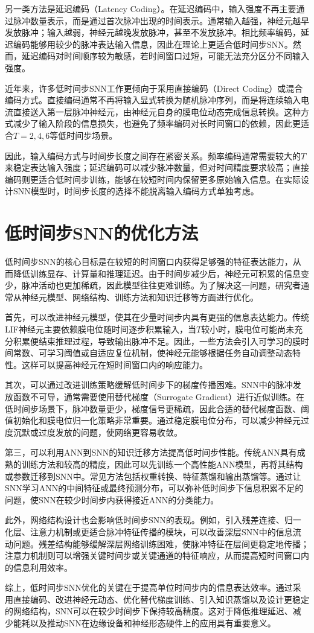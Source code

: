 \documentclass[journal,12pt,onecolumn]{IEEEtran}
\begin{document}
另一类方法是延迟编码（Latency Coding）。在延迟编码中，输入强度不再主要通过脉冲数量表示，而是通过首次脉冲出现的时间表示。通常输入越强，神经元越早发放脉冲；输入越弱，神经元越晚发放脉冲，甚至不发放脉冲。相比频率编码，延迟编码能够用较少的脉冲表达输入信息，因此在理论上更适合低时间步SNN。然而，延迟编码对时间顺序较为敏感，若时间窗口过短，可能无法充分区分不同输入强度。

近年来，许多低时间步SNN工作更倾向于采用直接编码（Direct Coding）或混合编码方式。直接编码通常不再将输入显式转换为随机脉冲序列，而是将连续输入电流直接送入第一层脉冲神经元，由神经元自身的膜电位动态完成信息转换。这种方式减少了输入阶段的信息损失，也避免了频率编码对长时间窗口的依赖，因此更适合$T=2,4,6$等低时间步场景。

因此，输入编码方式与时间步长度之间存在紧密关系。频率编码通常需要较大的$T$来稳定表达输入强度；延迟编码可以减少脉冲数量，但对时间精度要求较高；直接编码则更适合低时间步训练，能够在较短时间内保留更多原始输入信息。在实际设计SNN模型时，时间步长度的选择不能脱离输入编码方式单独考虑。

\section{低时间步SNN的优化方法}

低时间步SNN的核心目标是在较短的时间窗口内获得足够强的特征表达能力，从而降低训练显存、计算量和推理延迟。由于时间步减少后，神经元可积累的信息变少，脉冲活动也更加稀疏，因此模型往往更难训练。为了解决这一问题，研究者通常从神经元模型、网络结构、训练方法和知识迁移等方面进行优化。

首先，可以改进神经元模型，使其在少量时间步内具有更强的信息表达能力。传统LIF神经元主要依赖膜电位随时间逐步积累输入，当$T$较小时，膜电位可能尚未充分积累便结束推理过程，导致输出脉冲不足。因此，一些方法会引入可学习的膜时间常数、可学习阈值或自适应复位机制，使神经元能够根据任务自动调整动态特性。这样可以提高神经元在短时间窗口内的响应能力。

其次，可以通过改进训练策略缓解低时间步下的梯度传播困难。SNN中的脉冲发放函数不可导，通常需要使用替代梯度（Surrogate Gradient）进行近似训练。在低时间步场景下，脉冲数量更少，梯度信号更稀疏，因此合适的替代梯度函数、阈值初始化和膜电位归一化策略非常重要。通过稳定膜电位分布，可以减少神经元过度沉默或过度发放的问题，使网络更容易收敛。

第三，可以利用ANN到SNN的知识迁移方法提高低时间步性能。传统ANN具有成熟的训练方法和较高的精度，因此可以先训练一个高性能ANN模型，再将其结构或参数迁移到SNN中。常见方法包括权重转换、特征蒸馏和输出蒸馏等。通过让SNN学习ANN的中间特征或最终预测分布，可以弥补低时间步下信息积累不足的问题，使SNN在较少时间步内获得接近ANN的分类能力。

此外，网络结构设计也会影响低时间步SNN的表现。例如，引入残差连接、归一化层、注意力机制或更适合脉冲特征传播的模块，可以改善深层SNN中的信息流动问题。残差结构能够缓解深层网络训练困难，使脉冲特征在层间更稳定地传播；注意力机制则可以增强关键时间步或关键通道的特征响应，从而提高短时间窗口内的信息利用效率。

综上，低时间步SNN优化的关键在于提高单位时间步内的信息表达效率。通过采用直接编码、改进神经元动态、优化替代梯度训练、引入知识蒸馏以及设计更稳定的网络结构，SNN可以在较少时间步下保持较高精度。这对于降低推理延迟、减少能耗以及推动SNN在边缘设备和神经形态硬件上的应用具有重要意义。
\end{document}
